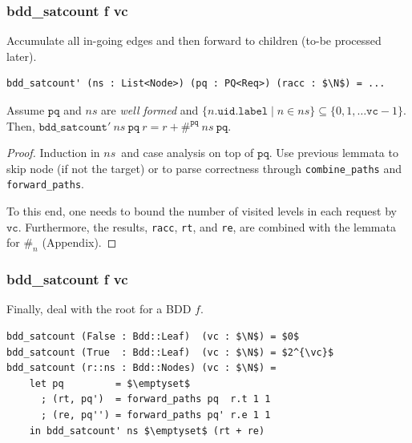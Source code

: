 \documentclass[english, aspectratio=169]{beamer}
\newcommand{\ns}[0]{\ensuremath{\mathit{ns}}}
\newcommand{\pq}[0]{\ensuremath{\texttt{pq}}}
\newcommand{\vc}[0]{\ensuremath{\texttt{vc}}}
\newcommand{\countPQ}[0]{\ensuremath{\#^{\pq}}}
\begin{document}
\begin{frame} %
  \frametitle{bdd\_satcount f vc}

  Accumulate all in-going edges and then forward to children (to-be processed later).
  \begin{lstlisting}
bdd_satcount' (ns : List<Node>) (pq : PQ<Req>) (racc : $\N$) = ...
  \end{lstlisting}

  \begin{lemma}
    Assume $\pq$ and $\ns$ are \emph{well formed} and
    $\{ n.\texttt{uid}.\texttt{label} \mid n \in \ns \} \subseteq \{ 0, 1, \dots \vc-1 \}$. Then,
    $\texttt{bdd\_satcount}'\ \ns\ \pq\ r = r + \countPQ\ \ns\ \pq$.
  \end{lemma}
  \begin{proof}
    \small

    Induction in \ns\ and case analysis on top of \pq. Use previous lemmata to skip node (if not the
    target) or to parse correctness through \texttt{combine\_paths} and \texttt{forward\_paths}.

    To this end, one needs to bound the number of visited levels in each request by \vc.
    Furthermore, the results, \texttt{racc}, \texttt{rt}, and \texttt{re}, are combined with the lemmata
    for $\#_n$ (Appendix).
  \end{proof}
\end{frame}


\begin{frame}[t, fragile]
  \frametitle{bdd\_satcount f vc}

  Finally, deal with the root for a BDD $f$.

  \begin{lstlisting}
bdd_satcount (False : Bdd::Leaf)  (vc : $\N$) = $0$
bdd_satcount (True  : Bdd::Leaf)  (vc : $\N$) = $2^{\vc}$
bdd_satcount (r::ns : Bdd::Nodes) (vc : $\N$) =
    let pq         = $\emptyset$
      ; (rt, pq')  = forward_paths pq  r.t 1 1
      ; (re, pq'') = forward_paths pq' r.e 1 1
    in bdd_satcount' ns $\emptyset$ (rt + re)
  \end{lstlisting}
\end{frame}
\end{document}
